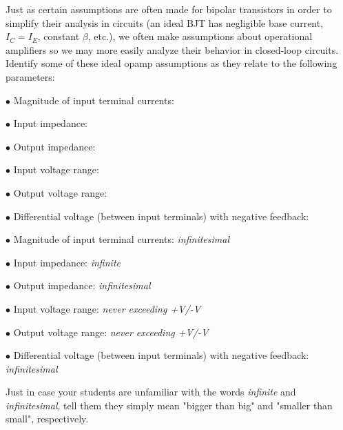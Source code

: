 

Just as certain assumptions are often made for bipolar transistors in order to simplify their analysis in circuits (an ideal BJT has negligible base current, $I_C = I_E$, constant $\beta$, etc.), we often make assumptions about operational amplifiers so we may more easily analyze their behavior in closed-loop circuits.  Identify some of these ideal opamp assumptions as they relate to the following parameters:

\medskip
\goodbreak
\item{$\bullet$} Magnitude of input terminal currents:
\item{$\bullet$} Input impedance:
\item{$\bullet$} Output impedance:
\item{$\bullet$} Input voltage range:
\item{$\bullet$} Output voltage range:
\item{$\bullet$} Differential voltage (between input terminals) with negative feedback:
\medskip







\medskip
\goodbreak
\item{$\bullet$} Magnitude of input terminal currents: {\it infinitesimal}
\item{$\bullet$} Input impedance: {\it infinite}
\item{$\bullet$} Output impedance: {\it infinitesimal}
\item{$\bullet$} Input voltage range: {\it never exceeding +V/-V}
\item{$\bullet$} Output voltage range: {\it never exceeding +V/-V}
\item{$\bullet$} Differential voltage (between input terminals) with negative feedback: {\it infinitesimal}
\medskip







Just in case your students are unfamiliar with the words {\it infinite} and {\it infinitesimal}, tell them they simply mean "bigger than big" and "smaller than small", respectively.




